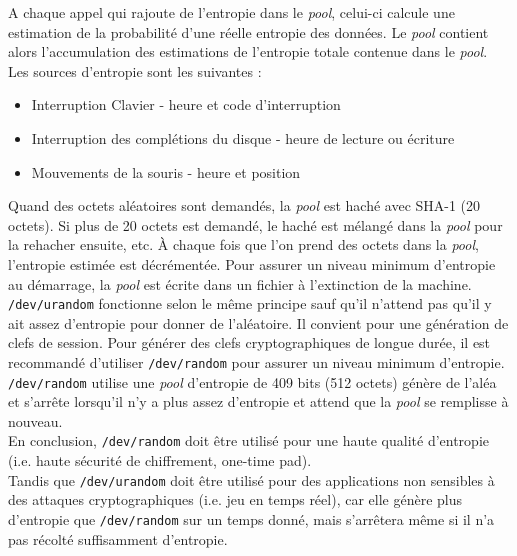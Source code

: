 			A chaque appel qui rajoute de l'entropie dans le \textit{pool}, 
			celui-ci calcule une estimation de la probabilité d'une réelle 
			entropie des données. 
			Le \textit{pool} contient alors l'accumulation des estimations 
			de l'entropie totale contenue dans le \textit{pool}.\\
						
			Les sources d'entropie sont les suivantes :
			\begin{itemize}
			\item Interruption Clavier - heure et code d'interruption 
			\item Interruption des complétions du disque - heure de 
			lecture ou écriture
			\item Mouvements de la souris - heure et position\\
			\end{itemize}
			
			Quand des octets aléatoires sont demandés, la \textit{pool} 
			est haché avec SHA-1 (20 octets). Si plus de 20 octets 
			est demandé, le haché est mélangé dans la \textit{pool} 
			pour la rehacher ensuite, etc. À chaque fois que l’on prend des 
			octets dans la \textit{pool}, l’entropie estimée est décrémentée. 
			Pour assurer un niveau minimum d'entropie au démarrage, 
			la \textit{pool} est écrite dans un fichier à l'extinction 
			de la machine.\\
			
			\texttt{/dev/urandom} fonctionne selon le même principe sauf 
			qu'il n'attend pas qu'il y ait assez d'entropie pour donner de 
			l'aléatoire. Il convient pour une génération de clefs de session. 
			Pour générer des clefs cryptographiques de longue durée, il 
			est recommandé d'utiliser \texttt{/dev/random} pour assurer 
			un niveau minimum d'entropie.\\
			
			\texttt{/dev/random} utilise une \textit{pool} d'entropie de 409
			bits (512 octets) génère de l'aléa et s'arrête lorsqu'il n'y a 
			plus assez d’entropie et attend que la \textit{pool} se remplisse 
			à nouveau.\\
			
			En conclusion, \texttt{/dev/random} doit être utilisé pour une haute 
			qualité d'entropie (i.e. haute sécurité de chiffrement, one-time
			pad).\\
			Tandis que \texttt{/dev/urandom} doit être utilisé pour des
			applications non sensibles à des attaques cryptographiques 
			(i.e. jeu en temps réel), car elle génère plus d'entropie que 
			\texttt{/dev/random} sur un temps donné, mais s'arrêtera même 
			si il n'a pas récolté suffisamment d'entropie.\\

